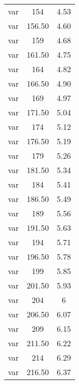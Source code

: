 \begin{table}[h]
\begin{center}
\begin{tabular}{ccc}
var & 154 & 4.53 \\

var & 156.50 & 4.60 \\

var & 159 & 4.68 \\

var & 161.50 & 4.75 \\

var & 164 & 4.82 \\

var & 166.50 & 4.90 \\

var & 169 & 4.97 \\

var & 171.50 & 5.04 \\

var & 174 & 5.12 \\

var & 176.50 & 5.19 \\

var & 179 & 5.26 \\

var & 181.50 & 5.34 \\

var & 184 & 5.41 \\

var & 186.50 & 5.49 \\

var & 189 & 5.56 \\

var & 191.50 & 5.63 \\

var & 194 & 5.71 \\

var & 196.50 & 5.78 \\

var & 199 & 5.85 \\

var & 201.50 & 5.93 \\

var & 204 & 6 \\

var & 206.50 & 6.07 \\

var & 209 & 6.15 \\

var & 211.50 & 6.22 \\

var & 214 & 6.29 \\

var & 216.50 & 6.37 \\


\end{tabular}
\end{center}
\end{table}
